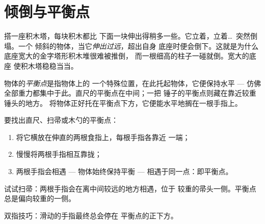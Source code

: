 \section{倾倒与平衡点}

\begin{example}[倾斜过度的塔]\label{ex:g2:balance-equilibrium:tower}
搭一座积木塔，每块积木都比
下面一块伸出得稍多一些。它立着，立着\dots\ 突然倒塌。一个
倾斜的物体，当它\emph{伸出过远}，超出自身
底座时便会倒下。这就是为什么底座宽大的金字塔形积木堆很难被推倒，
而一根细高的柱子一碰就倒。宽大的底座
使积木塔稳稳当当。
\end{example}

\begin{definition}[平衡点]\label{def:g2:balance-equilibrium:point}
物体的\emph{平衡点}是指物体上的
一个特殊位置，在此托起物体，它便保持水平 --- 仿佛
全部重力都集中于此。直尺的平衡点在中间；一把
锤子的平衡点则藏在靠近较重锤头的地方。
将物体正好托在平衡点下方，它便能水平地搁在一根手指上。
\end{definition}

\begin{method}[寻找平衡点]\label{met:g2:balance-equilibrium:find}
要找出直尺、扫帚或木勺的平衡点：
\begin{enumerate}
  \item 将它横放在伸直的两根食指上，每根手指各靠近
        一端；
  \item 慢慢将两根手指相互靠拢；
  \item 两根手指会相遇 --- 物体始终保持平衡 ---
        相遇于同一点：即平衡点。
\end{enumerate}
试试扫帚：两根手指会在离中间较远的地方相遇，位于
较重的帚头一侧。平衡点总是偏向较重的一侧。
\end{method}

\begin{omfigure}

{\small 双指技巧：滑动的手指最终总会停在
平衡点的正下方。}
\end{omfigure}

